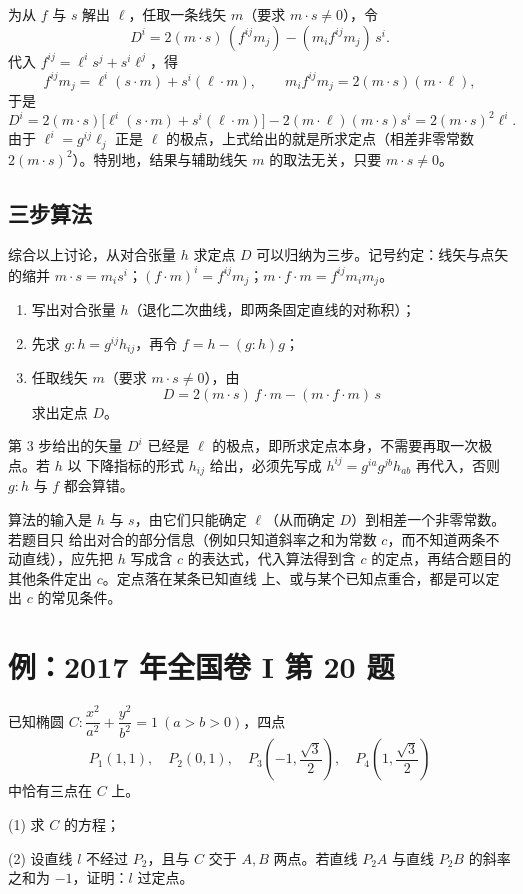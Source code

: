 为从 $f$ 与 $s$ 解出 $\ell$，任取一条线矢 $m$（要求 $m\cdot s\neq0$），令
\[
D^i=2(m\cdot s)\,(f^{ij}m_j)-(m_if^{ij}m_j)\,s^i .
\]
代入 $f^{ij}=\ell^is^j+s^i\ell^j$，得
\[
f^{ij}m_j=\ell^i(s\cdot m)+s^i(\ell\cdot m),
\qquad
m_if^{ij}m_j=2(m\cdot s)(m\cdot\ell),
\]
于是
\[
D^i=2(m\cdot s)\bigl[\ell^i(s\cdot m)+s^i(\ell\cdot m)\bigr]-2(m\cdot\ell)(m\cdot s)s^i
=2(m\cdot s)^2\ell^i .
\]
由于 $\ell^i=g^{ij}\ell_j$ 正是 $\ell$ 的极点，上式给出的就是所求定点（相差非零常数
$2(m\cdot s)^2$）。特别地，结果与辅助线矢 $m$ 的取法无关，只要 $m\cdot s\neq0$。

\subsection{三步算法}

综合以上讨论，从对合张量 $h$ 求定点 $D$ 可以归纳为三步。记号约定：线矢与点矢的缩并
$m\cdot s=m_is^i$；$(f\cdot m)^i=f^{ij}m_j$；$m\cdot f\cdot m=f^{ij}m_im_j$。
\begin{enumerate}
\item 写出对合张量 $h$（退化二次曲线，即两条固定直线的对称积）；
\item 先求 $g:h=g^{ij}h_{ij}$，再令 $f=h-(g:h)g$；
\item 任取线矢 $m$（要求 $m\cdot s\neq0$），由
\[
D=2(m\cdot s)\,f\cdot m-(m\cdot f\cdot m)\,s
\]
求出定点 $D$。
\end{enumerate}

\begin{remark}
第 3 步给出的矢量 $D^i$ 已经是 $\ell$ 的极点，即所求定点本身，不需要再取一次极点。若 $h$ 以
下降指标的形式 $h_{ij}$ 给出，必须先写成 $h^{ij}=g^{ia}g^{jb}h_{ab}$ 再代入，否则 $g:h$ 与
$f$ 都会算错。
\end{remark}

\begin{remark}
算法的输入是 $h$ 与 $s$，由它们只能确定 $\ell$（从而确定 $D$）到相差一个非零常数。若题目只
给出对合的部分信息（例如只知道斜率之和为常数 $c$，而不知道两条不动直线），应先把 $h$ 写成含
$c$ 的表达式，代入算法得到含 $c$ 的定点，再结合题目的其他条件定出 $c$。定点落在某条已知直线
上、或与某个已知点重合，都是可以定出 $c$ 的常见条件。
\end{remark}

\section{例：2017 年全国卷 I 第 20 题}

\begin{example}\label{ex:2017}
已知椭圆 $C:\dfrac{x^2}{a^2}+\dfrac{y^2}{b^2}=1\ (a>b>0)$，四点
\[
P_1(1,1),\quad P_2(0,1),\quad
P_3\!\left(-1,\dfrac{\sqrt3}{2}\right),\quad P_4\!\left(1,\dfrac{\sqrt3}{2}\right)
\]
中恰有三点在 $C$ 上。

(1) 求 $C$ 的方程；

(2) 设直线 $l$ 不经过 $P_2$，且与 $C$ 交于 $A,B$ 两点。若直线 $P_2A$ 与直线 $P_2B$ 的斜率
之和为 $-1$，证明：$l$ 过定点。
\end{example}

